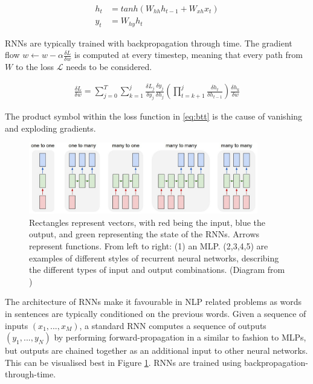 \documentclass[12pt,twoside]{report}
\begin{document}
\begin{equation}
	\label{eq:rnn}
	\begin{aligned}
		h_t &= tanh(W_{hh}h_{t-1}+W_{xh}x_t)
	\\
	y_t &= W_{hy}h_t
	\end{aligned}
	\end{equation}

RNNs are typically trained with backpropagation through time. The gradient flow $w \leftarrow w - \alpha \frac{\delta L}{\delta w}$ is computed at every timestep, meaning that every path from $W$ to the loss $\mathcal{L}$ needs to be considered.

\begin{equation}
	\label{eq:btt}
	\begin{aligned}
		\frac{\delta L}{\delta w} = \sum^T_{j=0}\sum^j_{k=1}\frac{\delta L_j}{\delta y_j}\frac{\delta y_j}{\delta h_j}(\prod^j_{t=k+1}\frac{\delta h_t}{\delta h_{t-1}})\frac{\delta h_k}{\delta w}
	\end{aligned}
	\end{equation}

The product symbol within the loss function in \ref{eq:btt} is the cause of vanishing and exploding gradients.




\begin{figure}[!ht]
      
	\centering
	\includegraphics[width=100mm]{diagrams/rnn.jpeg}
	\caption{Rectangles represent vectors, with red being the input, blue the output, and green representing the state of the RNNs. Arrows represent  functions. From left to right: (1) an MLP. (2,3,4,5) are examples of different styles of recurrent neural networks, describing the different types of input and output combinations. (Diagram from \cite{karpathy_unreasonable_2015}) \label{rnn}} 
  \end{figure}
  
The architecture of RNNs make it favourable in NLP related problems as words in sentences are typically conditioned on the previous words. Given a sequence of inputs $(x_1, ..., x_M)$, a standard RNN computes a sequence of outputs $(y_1, ..., y_N)$ by performing forward-propagation in a similar to fashion to MLPs, but outputs are chained together as an additional input to other neural networks. This can be visualised best in Figure \ref{rnn}. RNNs are trained using backpropagation-through-time.
\end{document}
